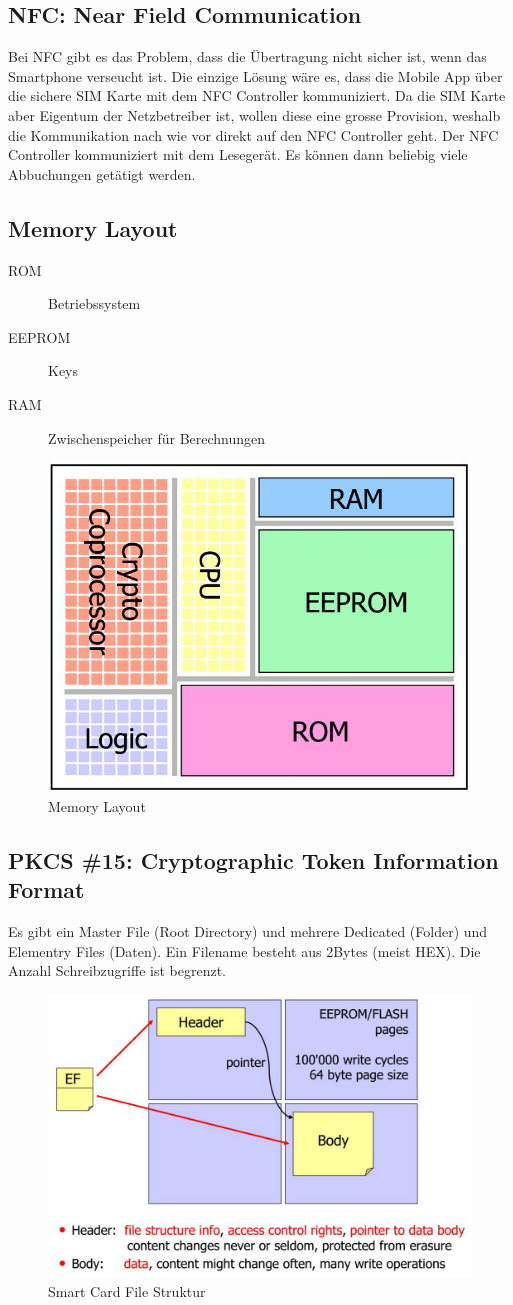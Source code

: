 \subsection{NFC: Near Field Communication}
Bei NFC gibt es das Problem, dass die Übertragung nicht sicher ist, wenn das Smartphone verseucht ist. Die einzige Lösung wäre es, dass die Mobile App über die sichere SIM Karte mit dem NFC Controller kommuniziert. Da die SIM Karte aber Eigentum der Netzbetreiber ist, wollen diese eine grosse Provision, weshalb die Kommunikation nach wie vor direkt auf den NFC Controller geht. Der NFC Controller kommuniziert mit dem Lesegerät. Es können dann beliebig viele Abbuchungen getätigt werden.

\subsection{Memory Layout}
\begin{description}
	\item[ROM] Betriebssystem
	\item[EEPROM] Keys
	\item[RAM] Zwischenspeicher für Berechnungen
\end{description}
\begin{figure}[h]
\centering
\includegraphics[width=0.5\linewidth]{images/card_memory_layout}
\caption{Memory Layout}
\label{fig:cardmemorylayout}
\end{figure}

\subsection{PKCS \#15: Cryptographic Token Information Format}
Es gibt ein Master File (Root Directory) und mehrere Dedicated (Folder) und Elementry Files (Daten). Ein Filename besteht aus 2Bytes (meist HEX). Die Anzahl Schreibzugriffe ist begrenzt. 

\begin{figure}[h]
\centering
\includegraphics[width=0.5\linewidth]{images/smart_card_file_structure}
\caption{Smart Card File Struktur}
\label{fig:smartcardfilestructure}
\end{figure}

